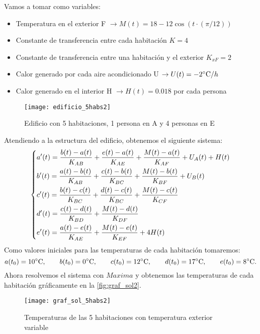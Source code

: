 Vamos a tomar como variables:
\begin{itemize}
	\item Temperatura en el exterior F $\rightarrow M(t) = 18-12\cos(t\cdot(\pi/12))$
	\item Constante de transferencia entre cada habitación $K = 4$
	\item Constante de transferencia entre una habitación y el exterior $K_{xF} = 2$
	\item Calor generado por cada aire acondicionado U $\rightarrow U(t) = -2\celsius / h$
	\item Calor generado en el interior H $\rightarrow H(t) = 0.018$ por cada persona
\end{itemize}
\begin{figure}[h!]
	\centering
	\texttt{[image: edificio\_5habs2]}
	\caption{Edificio con 5 habitaciones, 1 persona en A y 4 personas en E}
	\label{fig:edif5_2}
\end{figure}
Atendiendo a la estructura del edificio, obtenemos el siguiente sistema:
\begin{equation}\begin{dcases}
		a'(t)= \dfrac{b(t)-a(t)}{K_{AB}} + \dfrac{e(t)-a(t)}{K_{AE}} + \dfrac{M(t) - a(t)}{K_{AF}} + U_A(t) + H(t) \\  b'(t)= \dfrac{a(t)-b(t)}{K_{AB}} + \dfrac{c(t)-b(t)}{K_{BC}} + \dfrac{M(t) - b(t)}{K_{BF}} + U_B(t) \\ c'(t)= \dfrac{b(t)-c(t)}{K_{BC}} + \dfrac{d(t)-c(t)}{K_{BC}} + \dfrac{M(t) - c(t)}{K_{CF}} \\  d'(t)= \dfrac{c(t)-d(t)}{K_{BD}} + \dfrac{M(t) - d(t)}{K_{DF}} \\  e'(t)= \dfrac{a(t)-e(t)}{K_{AE}} + \dfrac{M(t) - e(t)}{K_{EF}} + 4H(t) \end{dcases}
\end{equation}
Como valores iniciales para las temperaturas de cada habitación tomaremos:
\begin{equation}
	a(t_0) = 10 \celsius, \qquad b(t_0) = 0 \celsius, \qquad c(t_0) = 12 \celsius, \qquad d(t_0) = 17 \celsius, \qquad e(t_0) = 8 \celsius.
\end{equation}
Ahora resolvemos el sistema con $Maxima$ y obtenemos las temperaturas de cada habitación gráficamente en la \autoref{fig:graf_sol2}.
\begin{figure}[h!]
	\centering
	\texttt{[image: graf\_sol\_5habs2]}
	\caption{Temperaturas de las 5 habitaciones con temperatura exterior variable}
	\label{fig:graf_sol2}
\end{figure}
